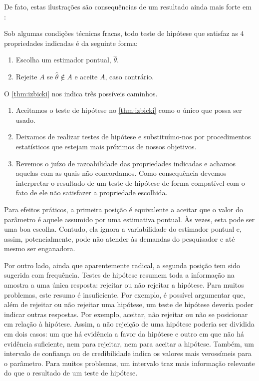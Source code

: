 De fato, estas ilustrações são 
consequências de um resultado ainda mais forte em
\citet{Izbicki2015}:
\begin{theorem}
 \label{thm:izbicki}
 Sob algumas condições técnicas fracas,
 todo teste de hipótese que satisfaz as 
 $4$ propriedades indicadas é 
 da seguinte forma:
 \begin{enumerate}
  \item Escolha um estimador pontual, $\hat{\theta}$.
  \item Rejeite $A$ se $\hat{\theta} \notin A$ e
  aceite $A$, caso contrário.
 \end{enumerate}
\end{theorem}

O \cref{thm:izbicki} nos indica 
três possíveis caminhos. 
\begin{enumerate}
 \item Aceitamos o teste de hipótese no
 \cref{thm:izbicki} como o único que 
 possa ser usado.
 \item Deixamos de realizar testes de hipótese e
 substituímo-nos por procedimentos estatísticos que
 estejam mais próximos de nossos objetivos.
 \item Revemos o juízo de razoabilidade das 
 propriedades indicadas e achamos aquelas com 
 as quais não concordamos.
 Como consequência devemos interpretar o resultado de
 um teste de hipótese de forma compatível com 
 o fato de ele não satisfazer a propriedade escolhida.
\end{enumerate}

Para efeitos práticos, 
a primeira posição é equivalente
a aceitar que o valor do parâmetro
é aquele assumido por uma estimativa pontual.
Às vezes, esta pode ser uma boa escolha.
Contudo, ela ignora a variabilidade do estimador pontual
e, assim, potencialmente,
pode não atender às demandas do pesquisador e
até mesmo ser enganadora.

Por outro lado, ainda que aparentemente radical, 
a segunda posição tem sido sugerida com frequência.
Testes de hipótese resumem toda a informação na amostra
a uma única resposta: rejeitar ou 
não rejeitar a hipótese.
Para muitos problemas, este resumo é insuficiente.
Por exemplo, é possível argumentar que, 
além de rejeitar ou não rejeitar uma hipótese,
um teste de hipótese deveria poder indicar
outras respostas.
Por exemplo, aceitar, não rejeitar ou 
não se posicionar em relação à hipótese.
Assim, a não rejeição de uma hipótese poderia
ser dividida em dois casos:
um que há evidência a favor da hipótese e 
outro em que não há evidência suficiente, 
nem para rejeitar, nem para aceitar a hipótese.
Também, um intervalo de confiança ou 
de credibilidade indica os valores mais verossímeis 
para o parâmetro.
Para muitos problemas, um intervalo traz
mais informação relevante do que 
o resultado de um teste de hipótese.

